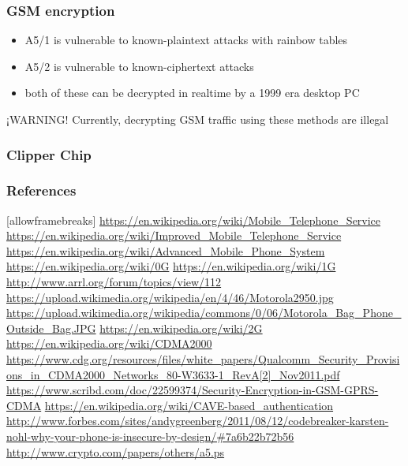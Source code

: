 \documentclass{beamer}
\begin{document}
\begin{frame}
  \frametitle{GSM encryption}
  \begin{itemize}
    \item A5/1 is vulnerable to known-plaintext attacks with rainbow tables
    \item A5/2 is vulnerable to known-ciphertext attacks
    \item both of these can be decrypted in realtime by a 1999 era desktop PC

  \end{itemize}
  \begin{alertblock}{¡WARNING!}
    Currently, decrypting GSM traffic using these methods are illegal
  \end{alertblock}
\end{frame}

\begin{frame}
  \frametitle{Clipper Chip}
\end{frame}



\begin{frame}
  \frametitle{References}[allowframebreaks]
  \url{https://en.wikipedia.org/wiki/Mobile_Telephone_Service}
  \url{https://en.wikipedia.org/wiki/Improved_Mobile_Telephone_Service}
  \url{https://en.wikipedia.org/wiki/Advanced_Mobile_Phone_System}
  \url{https://en.wikipedia.org/wiki/0G}
  \url{https://en.wikipedia.org/wiki/1G}
  \url{http://www.arrl.org/forum/topics/view/112}
  \url{https://upload.wikimedia.org/wikipedia/en/4/46/Motorola2950.jpg}
  \url{https://upload.wikimedia.org/wikipedia/commons/0/06/Motorola_Bag_Phone_Outside_Bag.JPG}
  \url{https://en.wikipedia.org/wiki/2G}
  \url{https://en.wikipedia.org/wiki/CDMA2000}
  \url{https://www.cdg.org/resources/files/white_papers/Qualcomm_Security_Provisions_in_CDMA2000_Networks_80-W3633-1_RevA[2]_Nov2011.pdf}
  \url{https://www.scribd.com/doc/22599374/Security-Encryption-in-GSM-GPRS-CDMA}
  \url{https://en.wikipedia.org/wiki/CAVE-based_authentication}
  \url{http://www.forbes.com/sites/andygreenberg/2011/08/12/codebreaker-karsten-nohl-why-your-phone-is-insecure-by-design/\#7a6b22b72b56}
  \url{http://www.crypto.com/papers/others/a5.ps}
\end{frame}
\end{document}
